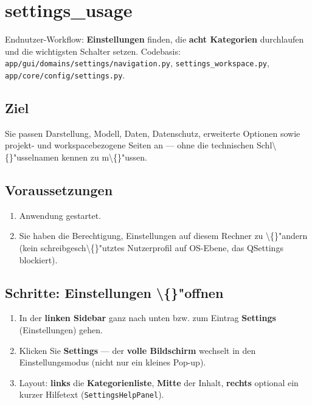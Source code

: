 \section{settings\_usage}

Endnutzer-Workflow: \textbf{Einstellungen} finden, die \textbf{acht Kategorien} durchlaufen und die wichtigsten Schalter setzen. Codebasis: \texttt{app/gui/domains/settings/navigation.py}, \texttt{settings\_workspace.py}, \texttt{app/core/config/settings.py}.

\subsection{Ziel}

Sie passen Darstellung, Modell, Daten, Datenschutz, erweiterte Optionen sowie projekt- und workspacebezogene Seiten an --- ohne die technischen Schl\textbackslash\{\}"usselnamen kennen zu m\textbackslash\{\}"ussen.

\subsection{Voraussetzungen}

\begin{enumerate}
\item Anwendung gestartet.
\item Sie haben die Berechtigung, Einstellungen auf diesem Rechner zu \textbackslash\{\}"andern (kein schreibgesch\textbackslash\{\}"utztes Nutzerprofil auf OS-Ebene, das QSettings blockiert).
\end{enumerate}

\subsection{Schritte: Einstellungen \textbackslash\{\}"offnen}

\begin{enumerate}
\item In der \textbf{linken Sidebar} ganz nach unten bzw. zum Eintrag \textbf{Settings} (Einstellungen) gehen.
\item Klicken Sie \textbf{Settings} --- der \textbf{volle Bildschirm} wechselt in den Einstellungsmodus (nicht nur ein kleines Pop-up).
\item Layout: \textbf{links} die \textbf{Kategorienliste}, \textbf{Mitte} der Inhalt, \textbf{rechts} optional ein kurzer Hilfetext (\texttt{SettingsHelpPanel}).
\end{enumerate}

